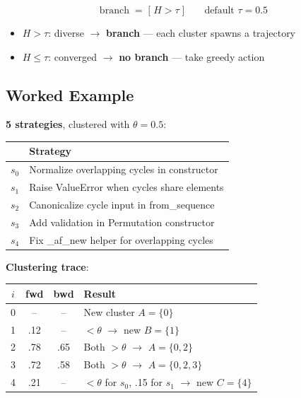 \documentclass[10pt,a4paper,twocolumn]{article}
\begin{document}
\begin{mathbox}[title=Branch Criterion]
\[
\text{branch} \;=\; \bigl[\; H > \tau \;\bigr] \qquad \text{default } \tau = 0.5
\]
\begin{itemize}[nosep,leftmargin=10pt]
\item $H > \tau$: diverse $\to$ \textbf{branch} --- each cluster spawns a trajectory
\item $H \le \tau$: converged $\to$ \textbf{no branch} --- take greedy action
\end{itemize}
\end{mathbox}

\subsection{Worked Example}

\textbf{5 strategies}, clustered with $\theta = 0.5$:

\begin{small}
\begin{tabular}{@{}cl@{}}
\toprule
& \textbf{Strategy} \\
\midrule
$s_0$ & Normalize overlapping cycles in constructor \\
$s_1$ & Raise ValueError when cycles share elements \\
$s_2$ & Canonicalize cycle input in from\_sequence \\
$s_3$ & Add validation in Permutation constructor \\
$s_4$ & Fix \_af\_new helper for overlapping cycles \\
\bottomrule
\end{tabular}
\end{small}

\textbf{Clustering trace}:

\begin{scriptsize}
\begin{tabular}{@{}cccp{}@{}}
\toprule
$i$ & \textbf{fwd} & \textbf{bwd} & \textbf{Result} \\
\midrule
0 & -- & -- & New cluster $A{=}\{0\}$ \\
1 & .12 & -- & $<\theta$ $\to$ new $B{=}\{1\}$ \\
2 & .78 & .65 & Both $>\theta$ $\to$ $A{=}\{0,2\}$ \\
3 & .72 & .58 & Both $>\theta$ $\to$ $A{=}\{0,2,3\}$ \\
4 & .21 & -- & $<\theta$ for $s_0$, .15 for $s_1$ $\to$ new $C{=}\{4\}$ \\
\bottomrule
\end{tabular}
\end{scriptsize}
\end{document}

